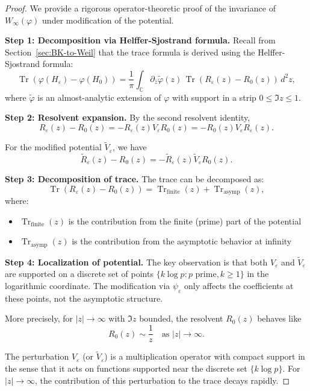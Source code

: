 ﻿\documentclass[12pt,a4paper]{article}
\theoremstyle{definition}
\theoremstyle{remark}
\newcommand{\CC}{\mathbb{C}}
\newcommand{\Tr}{\operatorname{Tr}}
\begin{document}
\begin{proof}
We provide a rigorous operator-theoretic proof of the invariance of $W_\infty(\varphi)$ under modification of the potential.

\textbf{Step 1: Decomposition via Helffer-Sjostrand formula.}
Recall from Section~\ref{sec:BK-to-Weil} that the trace formula is derived using the Helffer-Sjostrand formula:
\[
  \Tr(\varphi(H_\varepsilon) - \varphi(H_0)) = \frac{1}{\pi} \int_\CC \partial_{\bar z} \tilde{\varphi}(z) \, \Tr(R_\varepsilon(z) - R_0(z)) \, d^2z,
\]
where $\tilde{\varphi}$ is an almost-analytic extension of $\varphi$ with support in a strip $0 \leq \Im z \leq 1$.

\textbf{Step 2: Resolvent expansion.}
By the second resolvent identity,
\[
  R_\varepsilon(z) - R_0(z) = -R_\varepsilon(z) V_\varepsilon R_0(z) = -R_0(z) V_\varepsilon R_\varepsilon(z).
\]

For the modified potential $\widetilde{V}_\varepsilon$, we have
\[
  \widetilde{R}_\varepsilon(z) - R_0(z) = -\widetilde{R}_\varepsilon(z) \widetilde{V}_\varepsilon R_0(z).
\]

\textbf{Step 3: Decomposition of trace.}
The trace can be decomposed as:
\[
  \Tr(R_\varepsilon(z) - R_0(z)) = \Tr_{\text{finite}}(z) + \Tr_{\text{asymp}}(z),
\]
where:
\begin{itemize}
\item $\Tr_{\text{finite}}(z)$ is the contribution from the finite (prime) part of the potential
\item $\Tr_{\text{asymp}}(z)$ is the contribution from the asymptotic behavior at infinity
\end{itemize}

\textbf{Step 4: Localization of potential.}
The key observation is that both $V_\varepsilon$ and $\widetilde{V}_\varepsilon$ are supported on a discrete set of points $\{k \log p : p \text{ prime}, k \geq 1\}$ in the logarithmic coordinate. The modification via $\psi_\varepsilon$ only affects the coefficients at these points, not the asymptotic structure.

More precisely, for $|z| \to \infty$ with $\Im z$ bounded, the resolvent $R_0(z)$ behaves like
\[
  R_0(z) \sim \frac{1}{z} \quad \text{as } |z| \to \infty.
\]

The perturbation $V_\varepsilon$ (or $\widetilde{V}_\varepsilon$) is a multiplication operator with compact support in the sense that it acts on functions supported near the discrete set $\{k \log p\}$. For $|z| \to \infty$, the contribution of this perturbation to the trace decays rapidly.


\end{proof}
\end{document}
